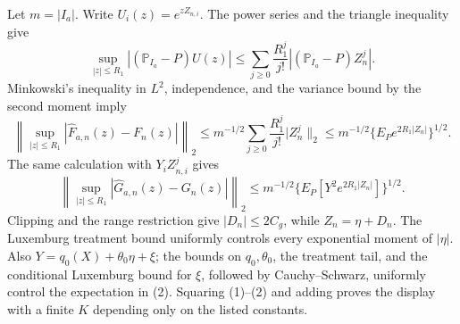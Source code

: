 Let \(m=|I_a|\).  Write \(U_i(z)=e^{zZ_{n,i}}\).  The power series and the triangle inequality give
\[
 \sup_{|z|\le R_1}|(\mathbb P_{I_a}-P)U(z)|
 \le\sum_{j\ge0}\frac{R_1^j}{j!}
 |(\mathbb P_{I_a}-P)Z_n^j|.
\]
Minkowski's inequality in \(L^2\), independence, and the variance bound by the second moment imply
\[
 \left\|\sup_{|z|\le R_1}|\widehat F_{a,n}(z)-F_n(z)|\right\|_2
 \le m^{-1/2}\sum_{j\ge0}\frac{R_1^j}{j!}|Z_n^j\|_2
 \le m^{-1/2}\{E_Pe^{2R_1|Z_n|}\}^{1/2}. \tag{1}
\]
The same calculation with \(Y_iZ_{n,i}^j\) gives
\[
 \left\|\sup_{|z|\le R_1}|\widehat G_{a,n}(z)-G_n(z)|\right\|_2
 \le m^{-1/2}\{E_P[Y^2e^{2R_1|Z_n|}]\}^{1/2}. \tag{2}
\]
Clipping and the range restriction give \(|D_n|\le2C_g\), while \(Z_n=\eta+D_n\).  The Luxemburg treatment bound uniformly controls every exponential moment of \(|\eta|\).  Also
\(Y=q_0(X)+\theta_0\eta+\xi\); the bounds on \(q_0,\theta_0\), the treatment tail, and the conditional Luxemburg bound for \(\xi\), followed by Cauchy--Schwarz, uniformly control the expectation in (2).  Squaring (1)--(2) and adding proves the display with a finite \(K\) depending only on the listed constants.